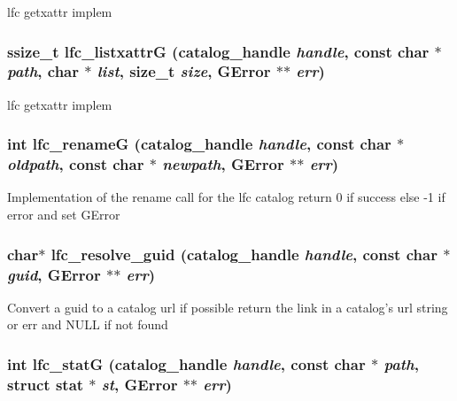 lfc getxattr implem 
\subsubsection{\setlength{\rightskip}{0pt plus 5cm}ssize\_\-t lfc\_\-listxattr\-G (catalog\_\-handle {\em handle}, const char $\ast$ {\em path}, char $\ast$ {\em list}, size\_\-t {\em size}, GError $\ast$$\ast$ {\em err})}\label{gfal__common__lfc_8c_e0af2e851445fcb0339ed760a9a78aff}


lfc getxattr implem 
\subsubsection{\setlength{\rightskip}{0pt plus 5cm}int lfc\_\-rename\-G (catalog\_\-handle {\em handle}, const char $\ast$ {\em oldpath}, const char $\ast$ {\em newpath}, GError $\ast$$\ast$ {\em err})}\label{gfal__common__lfc_8c_cb750f4f936abd772a5f53f5b1fbdaec}


Implementation of the rename call for the lfc catalog return 0 if success else -1 if error and set GError 
\subsubsection{\setlength{\rightskip}{0pt plus 5cm}char$\ast$ lfc\_\-resolve\_\-guid (catalog\_\-handle {\em handle}, const char $\ast$ {\em guid}, GError $\ast$$\ast$ {\em err})}\label{gfal__common__lfc_8c_b8943f8f5fd7211851bf7732d9c3b50b}


Convert a guid to a catalog url if possible return the link in a catalog's url string or err and NULL if not found 
\subsubsection{\setlength{\rightskip}{0pt plus 5cm}int lfc\_\-stat\-G (catalog\_\-handle {\em handle}, const char $\ast$ {\em path}, struct stat $\ast$ {\em st}, GError $\ast$$\ast$ {\em err})}\label{gfal__common__lfc_8c_51eb57986d959b753dbad4737f3e1b6f}


